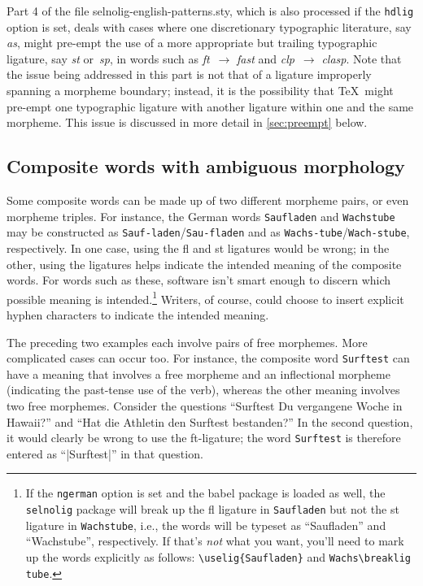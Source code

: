 \documentclass[11pt]{article}
\newcommand{\pkg}[1]{\textsf{#1}}
\newcommand{\opt}[1]{\texttt{#1}}
\begin{document}
Part 4 of the file \pkg{selnolig-english-patterns.sty}, which is also processed if the \opt{hdlig} option is set, deals with cases where one discretionary typographic literature, say \emph{as}, might pre-empt the use of a more appropriate but trailing typographic ligature, say \emph{st} or~\emph{sp}, in words such as \emph{ft}~$\to$ \emph{fast} and \emph{clp}~$\to$ \emph{clasp}. Note that the issue being addressed in this part is not that of a ligature improperly spanning a morpheme boundary; instead, it is the possibility that \TeX\ might pre-empt one typographic ligature with another ligature within one and the same morpheme. This issue is discussed in more detail in \cref{sec:preempt} below.


\subsection{Composite words with ambiguous morphology}

Some composite words can be made up of two different morpheme pairs, or even morpheme triples. For instance, the German words \opt{Saufladen} and \opt{Wachstube} may be constructed as \opt{Sauf-laden}\slash \opt{Sau-fladen} and as \opt{Wachs-tube}\slash \opt{Wach-stube}, respectively. In one case, using the fl and st ligatures would be wrong; in the other, using the ligatures helps indicate the intended meaning of the composite words. 
For words such as these, software isn't smart enough to discern which possible meaning is intended.\footnote{If the \opt{ngerman} option is set and the \pkg{babel} package is loaded as well, the \opt{selnolig} package will break up the fl ligature in \opt{Saufladen} but not the st ligature in \opt{Wachstube}, i.e., the words will be typeset as \enquote{Saufladen} and \enquote{Wachstube}, respectively. If that's \emph{not} what you want, you'll need to mark up the words explicitly as follows: \Verb+\uselig{Saufladen}+ and \Verb+Wachs\breaklig tube+.} 
Writers, of course, could choose to insert explicit hyphen characters to indicate the intended meaning.

The preceding two examples each involve pairs of free morphemes. More complicated cases can occur too. For instance, the composite word \opt{Surftest} can have a meaning that involves a free morpheme and an inflectional morpheme (indicating the past-tense use of the verb), whereas the other meaning involves two free morphemes. Consider the questions \enquote{Surftest Du vergangene Woche in Hawaii?} and \enquote{Hat die Athletin den Surf\breaklig tes\breaklig t bestanden?} In the second question, it would clearly be wrong to use the ft-ligature; the word \opt{Surftest} is therefore entered as ``|Surf\breaklig test|'' in that question.
\end{document}

